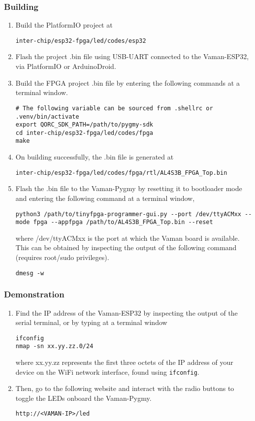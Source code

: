 \subsubsection{Building}
\begin{enumerate}
    \item Build the PlatformIO project at
    \begin{lstlisting}
inter-chip/esp32-fpga/led/codes/esp32
    \end{lstlisting}
    \item Flash the project .bin file using USB-UART connected to the 
    Vaman-ESP32, via PlatformIO or ArduinoDroid.
    \item Build the FPGA project .bin file by entering the following commands at
    a terminal window.
    \begin{lstlisting}
# The following variable can be sourced from .shellrc or .venv/bin/activate
export QORC_SDK_PATH=/path/to/pygmy-sdk
cd inter-chip/esp32-fpga/led/codes/fpga
make
    \end{lstlisting}
    \item On building successfully, the .bin file is generated at
    \begin{lstlisting}
inter-chip/esp32-fpga/led/codes/fpga/rtl/AL4S3B_FPGA_Top.bin
    \end{lstlisting}
    \item Flash the .bin file to the Vaman-Pygmy by resetting it to bootloader
    mode and entering the following command at a terminal window,
    \begin{lstlisting}
python3 /path/to/tinyfpga-programmer-gui.py --port /dev/ttyACMxx --mode fpga --appfpga /path/to/AL4S3B_FPGA_Top.bin --reset
    \end{lstlisting}
    where /dev/ttyACMxx is the port at which the Vaman board is available. This
    can be obtained by inspecting the output of the following command (requires
    root/sudo privileges).
    \begin{lstlisting}
dmesg -w
    \end{lstlisting}
\end{enumerate}

\subsubsection{Demonstration}
\begin{enumerate}
    \item Find the IP address of the Vaman-ESP32 by inspecting the output of the
    serial terminal, or by typing at a terminal window
    \begin{lstlisting}
ifconfig
nmap -sn xx.yy.zz.0/24
    \end{lstlisting}
    where xx.yy.zz represents the first three octets of the IP address of your
    device on the WiFi network interface, found using \texttt{ifconfig}.
    \item Then, go to the following website and interact with the radio buttons
    to toggle the LEDs onboard the Vaman-Pygmy. 
    \begin{lstlisting}
http://<VAMAN-IP>/led
    \end{lstlisting}
\end{enumerate}

